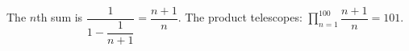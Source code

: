 The $n$th sum is $\dfrac1{1-\dfrac1{n+1}}=\dfrac{n+1}n$. The product telescopes: $\displaystyle\prod_{n=1}^{100}\dfrac{n+1}n=\boxed{101}$.

